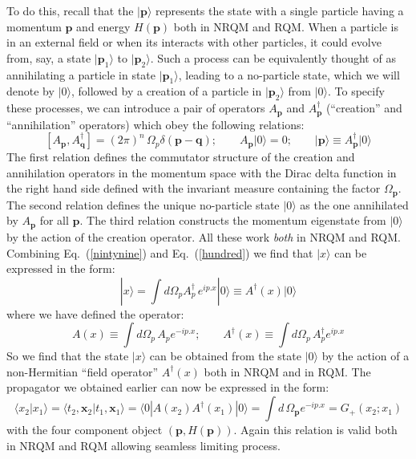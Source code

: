 \documentclass[12pt]{article}
\def\eq#1{{Eq.~(\ref{#1})}}
\def\ket#1{|#1\rangle}                    %
\def\bk#1#2#3{{\langle #1|#2|#3\rangle}}  %
\def\amp#1#2{\langle #1 | #2\rangle}      %
\begin{document}
 To do this, recall that the $\ket{\bm{p}}$ represents the state with a single particle having a momentum $\bm{p}$ and energy $H(\bm{p})$ both in NRQM and RQM. When  a particle is in an external field or when its interacts with other particles, it could evolve from, say, a state 
 $\ket{\bm{p}_1}$ to $\ket{\bm{p}_2}$.  Such a process can be equivalently thought of as annihilating a particle in state $\ket{\bm{p}_1}$, leading to a no-particle state, which we will denote by $\ket{0}$, followed by a creation of a particle in  $\ket{\bm{p}_2}$ from $\ket{0}$. To specify these processes, we can
 introduce a pair of operators $A_{\bm{p}}$ and $A^\dagger_{\bm{p}}$ (``creation'' and ``annihilation'' operators) which obey the following relations: 
\begin{equation}
\left[  A_{\bm{p}}, A^\dagger_{\bm{q}}\right] = (2\pi)^n \, \Omega_p \delta (\bm{p}- \bm{q});
 \qquad A_{\bm{p}}\ket{0}=0;  \qquad  \ket{\bm{p}} \equiv A^\dagger_{\bm{p}}\ket{0} 
 \label{hundred}
\end{equation} 
  The first relation defines the commutator structure of the creation and annihilation operators in the momentum space with the Dirac delta function in the right hand side defined with the invariant measure containing the factor $\Omega_{\bm{p}}$. The second relation defines the unique no-particle state $\ket{0}$ as the one annihilated by $A_{\bm{p}}$ for all $\bm{p}$. The third relation constructs the momentum eigenstate from $\ket{0} $ by the action of the creation operator. All these work \textit{both} in NRQM and RQM.
   Combining \eq{nintynine} and \eq{hundred} we find that $\ket{x}$ can be expressed in the form:
\begin{equation}
 \ket{x} =  \int d\Omega_p  A^\dagger_p \, e^{ip.x}\ket{0} \equiv A^\dagger(x)\ket{0} 
\end{equation}
where we have defined the operator:
\begin{equation}
 A(x) \equiv \int d\Omega_p \, A_p e^{-ip.x};\qquad A^\dagger(x) \equiv \int d\Omega_p \, A_p^\dagger e^{ip.x}
 \label{fop1}
\end{equation} 
  So we find that the state $\ket{x}$ can be obtained from the state $\ket{0}$ by the action of a 
  non-Hermitian ``field operator'' $A^\dagger(x)$ both in NRQM and in RQM. The propagator we obtained earlier can now be expressed in the form:
  \begin{equation}
   \amp{x_2}{x_1}=\amp{t_2,\bm{x}_2}{t_1,\bm{x}_1}=\bk{0}{A(x_2)A^\dagger(x_1)}{0}
   =\int d\,\Omega_{\bm{p}}e^{-ip.x}= G_+(x_2;x_1)
   \label{fourfour}
  \end{equation} 
 with the four component object $(\bm{p},H(\bm{p}))$. Again this relation is valid both in NRQM and RQM allowing seamless limiting process. 
 
\end{document}
